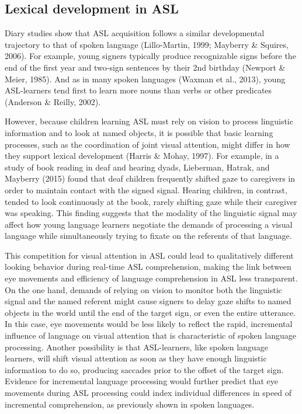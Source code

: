 \documentclass[oneside]{report}
\begin{document}
\subsection{Lexical development in
ASL}\label{lexical-development-in-asl}

Diary studies show that ASL acquisition follows a similar developmental
trajectory to that of spoken language (Lillo-Martin, 1999; Mayberry \&
Squires, 2006). For example, young signers typically produce
recognizable signs before the end of the first year and two-sign
sentences by their 2nd birthday (Newport \& Meier, 1985). And as in many
spoken languages (Waxman et al., 2013), young ASL-learners tend first to
learn more nouns than verbs or other predicates (Anderson \& Reilly,
2002).

However, because children learning ASL must rely on vision to process
linguistic information and to look at named objects, it is possible that
basic learning processes, such as the coordination of joint visual
attention, might differ in how they support lexical development (Harris
\& Mohay, 1997). For example, in a study of book reading in deaf and
hearing dyads, Lieberman, Hatrak, and Mayberry (2015) found that deaf
children frequently shifted gaze to caregivers in order to maintain
contact with the signed signal. Hearing children, in contrast, tended to
look continuously at the book, rarely shifting gaze while their
caregiver was speaking. This finding suggests that the modality of the
linguistic signal may affect how young language learners negotiate the
demands of processing a visual language while simultaneously trying to
fixate on the referents of that language.

This competition for visual attention in ASL could lead to qualitatively
different looking behavior during real-time ASL comprehension, making
the link between eye movements and efficiency of language comprehension
in ASL less transparent. On the one hand, demands of relying on vision
to monitor both the linguistic signal and the named referent might cause
signers to delay gaze shifts to named objects in the world until the end
of the target sign, or even the entire utterance. In this case, eye
movements would be less likely to reflect the rapid, incremental
influence of language on visual attention that is characteristic of
spoken language processing. Another possibility is that ASL-learners,
like spoken language learners, will shift visual attention as soon as
they have enough linguistic information to do so, producing saccades
prior to the offset of the target sign. Evidence for incremental
language processing would further predict that eye movements during ASL
processing could index individual differences in speed of incremental
comprehension, as previously shown in spoken languages.
\end{document}
